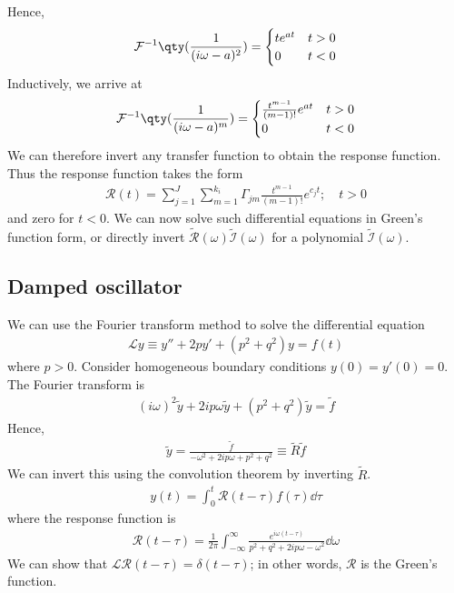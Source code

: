 Hence,
\begin{align*}
	\mathcal F\inv\qty(\frac{1}{(i \omega - a)^2}) = \begin{cases}
		t e^{at} & t > 0 \\
		0        & t < 0
	\end{cases}
\end{align*}
Inductively, we arrive at
\begin{align*}
	\mathcal F\inv\qty(\frac{1}{(i \omega - a)^m}) = \begin{cases}
		\frac{t^{m-1}}{(m-1)!} e^{at} & t > 0 \\
		0                             & t < 0
	\end{cases}
\end{align*}
We can therefore invert any transfer function to obtain the response function.
Thus the response function takes the form
\begin{align*}
	\mathcal R(t) = \sum_{j=1}^J \sum_{m=1}^{k_i} \Gamma_{jm} \frac{t^{m-1}}{(m-1)!} e^{c_j t};\quad t > 0
\end{align*}
and zero for $t < 0$.
We can now solve such differential equations in Green's function form, or directly invert $\widetilde{\mathcal R}(\omega) \widetilde{\mathcal I}(\omega)$ for a polynomial $\widetilde{\mathcal I}(\omega)$.

\subsection{Damped oscillator}
We can use the Fourier transform method to solve the differential equation
\begin{align*}
	\mathcal L y \equiv y'' + 2py' + (p^2 + q^2)y = f(t)
\end{align*}
where $p > 0$.
Consider homogeneous boundary conditions $y(0) = y'(0) = 0$.
The Fourier transform is
\begin{align*}
	(i\omega)^2 \widetilde y + 2 i p \omega \widetilde y + (p^2 + q^2) \widetilde y = \widetilde f
\end{align*}
Hence,
\begin{align*}
	\widetilde y = \frac{\widetilde f}{-\omega^2 + 2ip\omega + p^2 + q^2} \equiv \widetilde R \widetilde f
\end{align*}
We can invert this using the convolution theorem by inverting $\widetilde R$.
\begin{align*}
	y(t) = \int_0^t \mathcal R(t-\tau) f(\tau) \dd{\tau}
\end{align*}
where the response function is
\begin{align*}
	\mathcal R(t - \tau) = \frac{1}{2\pi} \int_{-\infty}^\infty \frac{e^{i\omega(t-\tau)}}{p^2 + q^2 + 2ip\omega - \omega^2} \dd{\omega}
\end{align*}
We can show that $\mathcal L \mathcal R(t-\tau) = \delta(t-\tau)$; in other words, $\mathcal R$ is the Green's function.

